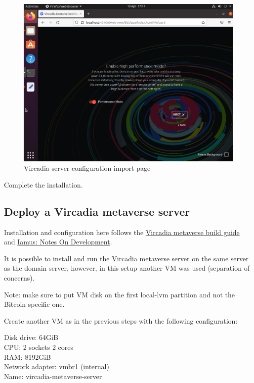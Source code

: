 \begin{figure}
\centering
\includegraphics{Vircadia6.png}
\caption{Vircadia server configuration import page}
\end{figure}

Complete the installation.

\hypertarget{deploy-a-vircadia-metaverse-server}{%
\subsection{Deploy a Vircadia metaverse
server}\label{deploy-a-vircadia-metaverse-server}}

Installation and configuration here follows the
\href{https://github.com/vircadia/vircadia-metaverse/blob/master/docs/Building.md}{Vircadia
metaverse build guide} and
\href{https://github.com/vircadia/vircadia-metaverse/blob/master/docs/NotesOnDevelopment.md}{Iamus:
Notes On Development}.

It is possible to install and run the Vircadia metaverse server on the
same server as the domain server, however, in this setup another VM was
used (separation of concerns).

Note: make sure to put VM disk on the first local-lvm partition and not
the Bitcoin specific one.

Create another VM as in the previous steps with the following
configuration:

Disk drive: 64GiB\\
CPU: 2 sockets 2 cores\\
RAM: 8192GiB\\
Network adapter: vmbr1 (internal)\\
Name: vircadia-metaverse-server

